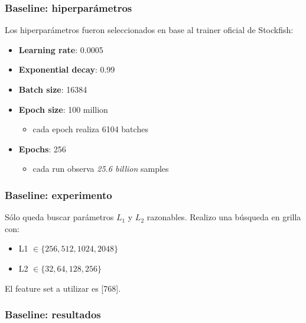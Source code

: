 \begin{frame}
\frametitle{Baseline: hiperparámetros}
Los hiperparámetros fueron seleccionados en base al trainer oficial de Stockfish:
\begin{itemize}
\item \textbf{Learning rate}: 0.0005
\item \textbf{Exponential decay}: 0.99
\item \textbf{Batch size}: 16384
\item \textbf{Epoch size}: 100 million
\begin{itemize}
    \item cada epoch realiza 6104 batches
\end{itemize}
\item \textbf{Epochs}: 256
\begin{itemize}
    \item cada run observa \textit{25.6 billion} samples
\end{itemize}
\end{itemize}
\end{frame}


\begin{frame}
\frametitle{Baseline: experimento}
Sólo queda buscar parámetros $L_1$ y $L_2$ razonables. Realizo una búsqueda en grilla con:
\begin{itemize}
\item L1 $\in \{256, 512, 1024, 2048\}$
\item L2 $\in \{32, 64, 128, 256\}$
\end{itemize}
El feature set a utilizar es [768].
\end{frame}

\begin{frame}
\frametitle{Baseline: resultados}
\begin{figure}
\centering
{}
\end{figure}
\end{frame}

